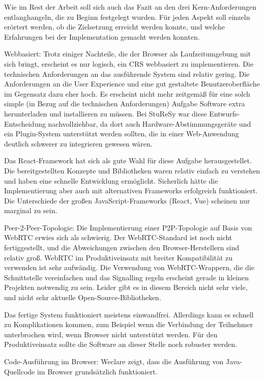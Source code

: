 Wie im Rest der Arbeit soll sich auch das Fazit an den drei Kern-Anforderungen entlanghangeln, die zu Beginn festgelegt wurden. Für jeden Aspekt soll einzeln erörtert werden, ob die Zielsetzung erreicht werden konnte, und welche Erfahrungen bei der Implementation gemacht werden konnten.

Webbasiert:
Trotz einiger Nachteile, die der Browser als Laufzeitumgebung mit sich bringt, erscheint es nur logisch, ein CRS webbasiert zu implementieren. Die technischen Anforderungen an das ausführende System sind relativ gering. Die Anforderungen an die User Experience und eine gut gestaltete Benutzeroberfläche im Gegensatz dazu eher hoch. Es erscheint nicht mehr zeitgemäß für eine solch simple (in Bezug auf die technischen Anforderungen) Aufgabe Software extra herunterladen und installieren zu müssen. Bei StuReSy war diese Entwurfs-Entscheidung nachvollziehbar, da dort auch Hardware-Abstimmungsgeräte und ein Plugin-System unterstützt werden sollten, die in einer Web-Anwendung deutlich schwerer zu integrieren gewesen wären.

Das React-Framework hat sich als gute Wahl für diese Aufgabe herausgestellet. Die bereitgestellten Konzepte und Bibliotheken waren relativ einfach zu verstehen und haben eine schnelle Entwicklung ermöglicht. Sicherlich hätte die Implementierung aber auch mit alternativen Frameworks erfolgreich funktioniert. Die Unterschiede der großen JavaScript-Frameworks (React, Vue) scheinen nur marginal zu sein.

Peer-2-Peer-Topologie: Die Implementierung einer P2P-Topologie auf Basis von WebRTC erwies sich als schwierig. Der WebRTC-Standard ist noch nicht fertiggestellt, und die Abweichungen zwischen den Browser-Herstellern sind relativ groß. WebRTC im Produktiveinsatz mit breiter Kompatibilität zu verwenden ist sehr aufwändig. Die Verwendung von WebRTC-Wrappern, die die Schnittstelle vereinfachen und das Signalling regeln erscheint gerade in kleinen Projekten notwendig zu sein. Leider gibt es in diesem Bereich nicht sehr viele, und nicht sehr aktuelle Open-Source-Bibliotheken.

Das fertige System funktioniert meistens einwandfrei. Allerdings kann es schnell zu Komplikationen kommen, zum Beispiel wenn die Verbindung der Teilnehmer unterbrochen wird, wenn Browser nicht unterstützt werden. Für den Produktiveinsatz sollte die Software an dieser Stelle noch robuster werden.

Code-Ausführung im Browser: Weclare zeigt, dass die Ausführung von Java-Quellcode im Browser grundsätzlich funktioniert.



